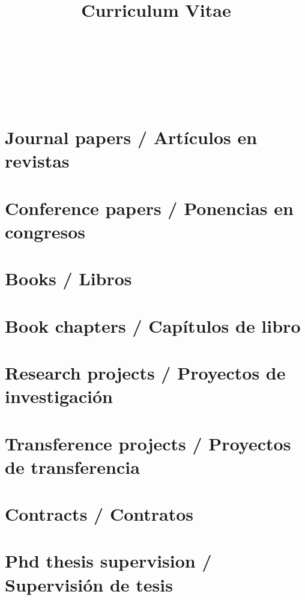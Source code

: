 \documentclass{article}
\title{Curriculum Vitae}
\author{
  \begin{tabular}{c}
      \\
    ~\\
     \\
     \\
     \\
    ~\\
     \\
    
  \end{tabular}
}
\begin{document}
\maketitle

\tableofcontents

\renewcommand{\refname}{}
\section{Journal papers / Artículos en revistas}


\renewcommand{\refname}{}
\section{Conference papers / Ponencias en congresos}


\renewcommand{\refname}{}
\section{Books / Libros}


\renewcommand{\refname}{}
\section{Book chapters / Capítulos de libro}


\renewcommand{\refname}{}
\section{Research projects / Proyectos de investigación}


\renewcommand{\refname}{}
\section{Transference projects / Proyectos de transferencia}


\renewcommand{\refname}{}
\section{Contracts / Contratos}


\renewcommand{\refname}{}
\section{Phd thesis supervision / Supervisión de tesis}

\end{document}
